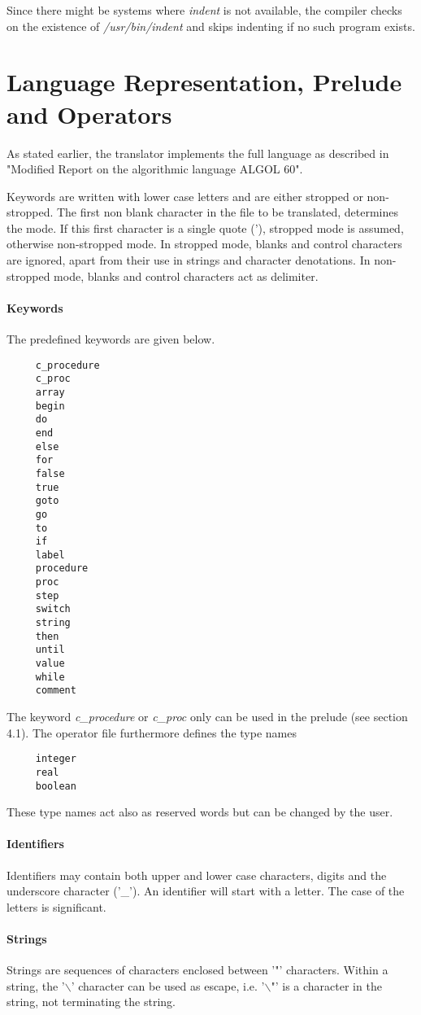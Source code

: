 \documentclass[11pt]{article}
\begin{document}
Since there might be systems where {\em indent} is not available, the compiler
checks on the existence of {\em /usr/bin/indent} and skips indenting
if no such program exists.

\section{Language Representation, Prelude and Operators}
As stated earlier, the translator implements the full language
as described in "Modified Report on the algorithmic language ALGOL 60".

Keywords are written with lower case letters and are either stropped or non-stropped.
The first non blank character in the file to be translated,
determines the mode.
If this first character is a single quote ('),
stropped mode is assumed, otherwise non-stropped mode.
In stropped mode, blanks and control characters are ignored, apart from their use in
strings and character denotations. In non-stropped mode, blanks and control characters act as delimiter.
\paragraph{Keywords}
The predefined keywords are given below.
{\footnotesize
\begin{verbatim}
     c_procedure
     c_proc
     array
     begin
     do
     end
     else
     for
     false
     true
     goto
     go
     to
     if
     label
     procedure
     proc
     step
     switch
     string
     then
     until
     value
     while
     comment
\end{verbatim}
}
The keyword {\em c\_procedure} or {\em c\_proc} only can be used in
the prelude (see section 4.1).
The operator file furthermore defines the type names
{\footnotesize
\begin{verbatim}
     integer
     real
     boolean
\end{verbatim}
}
These type names act also as reserved words but can be changed by the user.

\paragraph{Identifiers}
Identifiers may contain both upper and lower case characters, 
digits and the underscore character ('\_'). An identifier will start with a letter. The case of the letters is significant.

\paragraph{Strings}
Strings are sequences of characters enclosed between '"' characters.
Within a string, the '$\backslash$' character can be used as escape,
i.e. '$\backslash$"' 
is a character in the string, not terminating the string.
\end{document}
